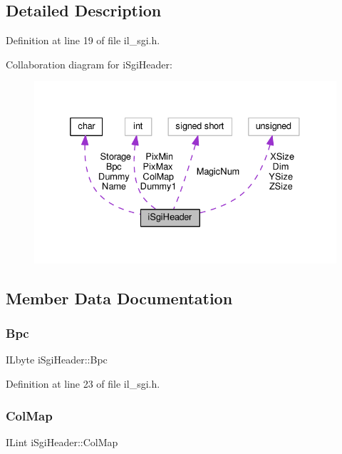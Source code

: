\subsection{Detailed Description}


Definition at line 19 of file il\+\_\+sgi.\+h.



Collaboration diagram for i\+Sgi\+Header\+:
\nopagebreak
\begin{figure}[H]
\begin{center}
\leavevmode
\includegraphics[width=332pt]{dc/df4/structiSgiHeader__coll__graph}
\end{center}
\end{figure}


\subsection{Member Data Documentation}
\mbox{\label{structiSgiHeader_a81387165d634c02dc3f4e47c633f3aad}} 
\subsubsection{\texorpdfstring{Bpc}{Bpc}}
{\footnotesize\ttfamily I\+Lbyte i\+Sgi\+Header\+::\+Bpc}



Definition at line 23 of file il\+\_\+sgi.\+h.

\mbox{\label{structiSgiHeader_a1af25cb97bec1877b5897325cba9cd99}} 
\subsubsection{\texorpdfstring{Col\+Map}{ColMap}}
{\footnotesize\ttfamily I\+Lint i\+Sgi\+Header\+::\+Col\+Map}



